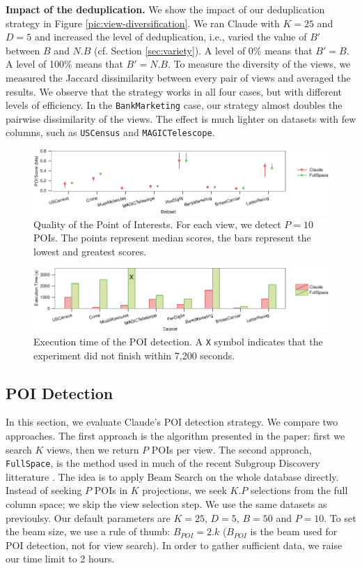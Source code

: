 \textbf{Impact of the deduplication.} We show the impact of our deduplication
strategy in Figure \ref{pic:view-diversification}.  We ran Claude with $K=25$
and $D=5$ and increased the level of deduplication, i.e., varied the value of
$B'$ between $B$ and $N.B$ (cf. Section \ref{sec:variety}). A level of 0\%
means that $B'=B$. A level of 100\% means that $B'=N.B$. To measure the
diversity of the views, we measured the Jaccard dissimilarity between every
pair of views and averaged the results. We observe that the strategy works in
all four cases, but with different levels of efficiency. In the
\texttt{BankMarketing} case, our strategy almost doubles the pairwise
dissimilarity of the views. The effect is much lighter on datasets with few
columns, such as \texttt{USCensus} and \texttt{MAGICTelescope}.
\begin{figure}[t!]
\centering
\includegraphics[width=1.8\columnwidth]{plots/POI-score}
\caption{Quality of the Point of Interests. For each view, we detect $P=10$
POIs. The
    points represent median scores, the bars represent the lowest and greatest
    scores.}
\label{pic:POI-quali}
\end{figure}
\begin{figure}[t!]
\centering
\includegraphics[width=1.8\columnwidth]{plots/POI-timing}
\caption{Execution time of the POI detection. A \texttt{X} symbol
indicates that the experiment did not finish within 7,200 seconds.}
\label{pic:POI-time}
\end{figure}

\subsection{POI Detection}
\label{sec:exp-poi}

In this section, we evaluate Claude's POI detection strategy. We compare two
approaches. The first approach is the algorithm presented in the paper: first
we search $K$ views, then we return $P$ POIs per view. The second approach,
\texttt{FullSpace}, is the method used in much of the recent Subgroup Discovery
litterature \cite{van2011non, duivesteijn2010subgroup}.  The idea is to apply
Beam Search on the whole database directly. Instead of seeking $P$ POIs in $K$
projections, we seek $K.P$ selections from the full column space; we skip the
view selection step. We use the same datasets as previoulsy. Our default
parameters are $K=25$, $D=5$, $B=50$ and $P=10$. To set the beam size, we use a rule of
thumb: $B_{POI} = 2.k$ ($B_{POI}$ is the beam used for POI detection,
not for view search). In order to gather sufficient data, we raise our time
limit to 2 hours. 

